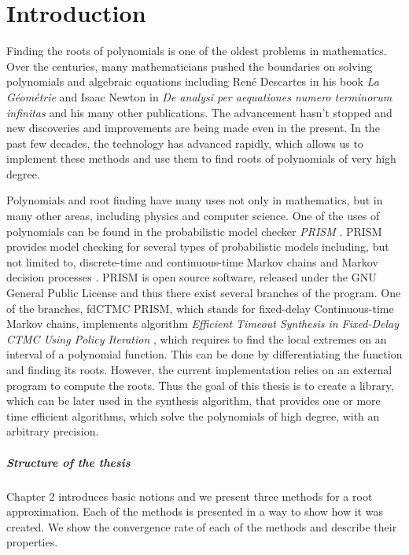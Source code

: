 \documentclass[
  digital, %
  notable,   %
  nolof,     %
  nolot,     %
	final, %
]{fithesis3}
\begin{document}
\newtheorem{theorem}{Theorem}[section] %
\newtheorem{corollary}[theorem]{Corollary}
\chapter{Introduction}
Finding the roots of polynomials is one of the oldest problems in mathematics. Over the centuries, many mathematicians pushed the boundaries on solving polynomials and algebraic equations including Ren{\'e} Descartes in his book \emph{La G{\'e}om{\'e}trie} \parencite{descart} and Isaac Newton in \emph{De analysi per aequationes numero terminorum infinitas} and his many other publications. The advancement hasn't stopped and new discoveries and improvements are being made even in the present. In the past few decades, the technology has advanced rapidly, which allows us to implement these methods and use them to find roots of polynomials of very high degree. 

Polynomials and root finding have many uses not only in mathematics, but in many other areas, including physics and computer science. One of the uses of polynomials can be found in the probabilistic model checker \emph{PRISM} \parencite{KNP11}. PRISM provides model checking for several types of probabilistic models including, but not limited to, discrete-time and continuous-time Markov chains and Markov decision processes \parencite{KNP11}. PRISM is open source software, released under the GNU General Public License and thus there exist several branches of the program. One of the branches, fdCTMC PRISM, which stands for fixed-delay Continuous-time Markov chains, implements algorithm \emph{Efficient Timeout Synthesis in Fixed-Delay CTMC Using Policy Iteration} \parencite{DBLP:conf/mascots/KorenciakKR16}, which requires to find the local extremes on an interval of a polynomial function. This can be done by differentiating the function and finding its roots. However, the current implementation relies on an external program to compute the roots. Thus the goal of this thesis is to create a library, which can be later used in the synthesis algorithm, that provides one or more time efficient algorithms, which solve the polynomials of high degree, with an arbitrary precision.

\paragraph{Structure of the thesis}
Chapter 2 introduces basic notions and we present three methods for a root approximation. Each of the methods is presented in a way to show how it was created. We show the convergence rate of each of the methods and describe their properties.
\end{document}
